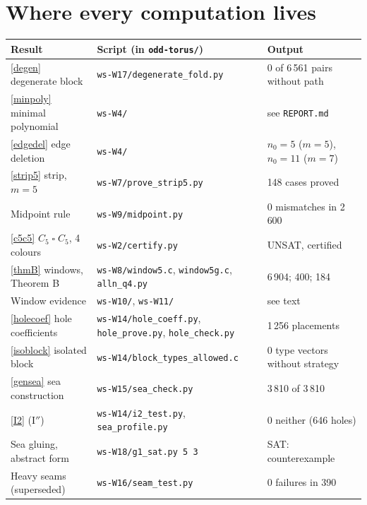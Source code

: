 \documentclass[11pt]{article}
\theoremstyle{plain}
\theoremstyle{definition}
\theoremstyle{remark}
\newcommand{\T}{\mathbin{\square}}
\newcommand{\script}[1]{\texttt{#1}}
\begin{document}
\appendix
\section{Where every computation lives}\label{app:scripts}

\begin{center}\small
\renewcommand{\arraystretch}{1.2}
\begin{tabular}{@{}p{4.3cm}p{5.6cm}p{4.6cm}@{}}
\toprule
Result & Script (in \script{odd-torus/}) & Output\\
\midrule
\ref{degen} degenerate block & \script{ws-W17/degenerate\_fold.py} & 0 of 6\,561 pairs without path\\
\ref{minpoly} minimal polynomial & \script{ws-W4/} & see \script{REPORT.md}\\
\ref{edgedel} edge deletion & \script{ws-W4/} & $n_0 = 5$ ($m=5$), $n_0 = 11$ ($m=7$)\\
\ref{strip5} strip, $m = 5$ & \script{ws-W7/prove\_strip5.py} & 148 cases proved\\
Midpoint rule & \script{ws-W9/midpoint.py} & 0 mismatches in 2\,600\\
\ref{c5c5} $C_5 \T C_5$, 4 colours & \script{ws-W2/certify.py} & UNSAT, certified\\
\ref{thmB} windows, Theorem B & \script{ws-W8/window5.c}, \script{window5g.c}, \script{alln\_q4.py} & 6\,904; 400; 184\\
Window evidence & \script{ws-W10/}, \script{ws-W11/} & see text\\
\ref{holecoef} hole coefficients & \script{ws-W14/hole\_coeff.py}, \script{hole\_prove.py}, \script{hole\_check.py} & 1\,256 placements\\
\ref{isoblock} isolated block & \script{ws-W14/block\_types\_allowed.c} & 0 type vectors without strategy\\
\ref{gensea} sea construction & \script{ws-W15/sea\_check.py} & 3\,810 of 3\,810\\
\ref{I2} (I$''$) & \script{ws-W14/i2\_test.py}, \script{sea\_profile.py} & 0 neither (646 holes)\\
Sea gluing, abstract form & \script{ws-W18/g1\_sat.py 5 3} & SAT: counterexample\\
Heavy seams (superseded) & \script{ws-W16/seam\_test.py} & 0 failures in 390\\
\bottomrule
\end{tabular}
\end{center}
\end{document}
